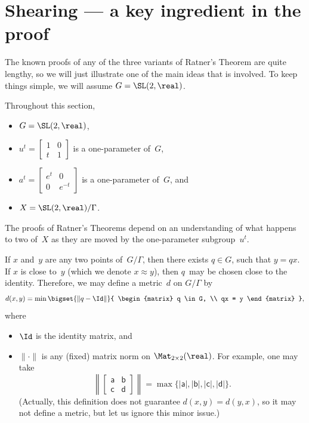 \section{Shearing --- a key ingredient in the proof} \label{RatnerShearingSect}

The known proofs of any of the three variants of Ratner's Theorem are quite lengthy, so we will just illustrate one of the main ideas that is involved. To keep things simple, we will assume $G = \SL(2,\real)$.

\begin{notation} \label{ShearingNotation}
 Throughout this section,
 \begin{itemize}
 \item $G = \SL(2,\real)$,
 \item $u^t = \begin{bmatrix} 1 & 0 \\ t & 1 \end{bmatrix}$ is a one-parameter
 of~$G$,
 \item $a^t= \begin{bmatrix} e^t & 0 \\ 0 & e^{-t} \end{bmatrix}$ is a  one-parameter
 of~$G$,
and
 \item $X = \SL(2,\real)/\Gamma$.
 \end{itemize}
 \end{notation}

The proofs of Ratner's Theorems depend on an understanding of what happens to two  of~$X$ as they are moved by the one-parameter subgroup~$u^t$.

\begin{defn}
 If $x$ and~$y$ are any two points of~$G/\Gamma$, then there
exists $q \in G$, such that $y = qx$. If $x$ is close to~$y$ (which we
denote 
	$x \approx y$), 
then $q$~may be chosen close to the identity. Therefore,
we may define a {metric}~$d$ on $G/\Gamma$ by
 $$ d(x,y) = \min \bigset{ \|q - \Id \| }{
 \begin{matrix} q \in G, \\ qx = y \end{matrix}
  } ,$$
 where
 \begin{itemize}
 \item $\Id$ is the identity matrix,
 and
 \item  $\| \cdot \|$ is any (fixed) matrix norm on
 $\Mat_{2 \times 2}(\real)$. For example, one may take
 $$ \left\| \begin{bmatrix} \mathsf{a} & \mathsf{b} \\ \mathsf{c} &
\mathsf{d} \end{bmatrix} \right \|
 = \max \bigl\{ |\mathsf{a}|, |\mathsf{b}|, |\mathsf{c}|, |\mathsf{d}|
\bigr\} .$$
(Actually, this definition does not guarantee $d(x,y) = d(y,x)$, so it may not define a metric, but let us ignore this minor issue.)
 \end{itemize}
 \end{defn}


